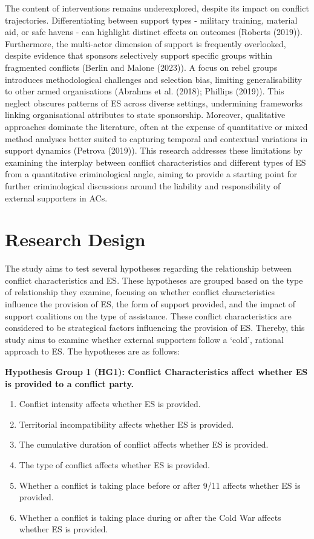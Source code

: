 \documentclass[
]{article}
\begin{document}
The content of interventions remains underexplored, despite its impact
on conflict trajectories. Differentiating between support types -
military training, material aid, or safe havens - can highlight distinct
effects on outcomes (Roberts (2019)). Furthermore, the multi-actor
dimension of support is frequently overlooked, despite evidence that
sponsors selectively support specific groups within fragmented conflicts
(Berlin and Malone (2023)). A focus on rebel groups introduces
methodological challenges and selection bias, limiting generalisability
to other armed organisations (Abrahms et al. (2018); Phillips (2019)).
This neglect obscures patterns of ES across diverse settings,
undermining frameworks linking organisational attributes to state
sponsorship. Moreover, qualitative approaches dominate the literature,
often at the expense of quantitative or mixed method analyses better
suited to capturing temporal and contextual variations in support
dynamics (Petrova (2019)). This research addresses these limitations by
examining the interplay between conflict characteristics and different
types of ES from a quantitative criminological angle, aiming to provide
a starting point for further criminological discussions around the
liability and responsibility of external supporters in ACs.

\section{Research Design}\label{research-design}

The study aims to test several hypotheses regarding the relationship
between conflict characteristics and ES. These hypotheses are grouped
based on the type of relationship they examine, focusing on whether
conflict characteristics influence the provision of ES, the form of
support provided, and the impact of support coalitions on the type of
assistance. These conflict characteristics are considered to be
strategical factors influencing the provision of ES. Thereby, this study
aims to examine whether external supporters follow a `cold', rational
approach to ES. The hypotheses are as follows:

\textbf{Hypothesis Group 1 (HG1): Conflict Characteristics affect
whether ES is provided to a conflict party.}

\begin{enumerate}
\def\labelenumi{\alph{enumi})}
\item
  Conflict intensity affects whether ES is provided.
\item
  Territorial incompatibility affects whether ES is provided.
\item
  The cumulative duration of conflict affects whether ES is provided.
\item
  The type of conflict affects whether ES is provided.
\item
  Whether a conflict is taking place before or after 9/11 affects
  whether ES is provided.
\item
  Whether a conflict is taking place during or after the Cold War
  affects whether ES is provided.
\end{enumerate}
\end{document}
